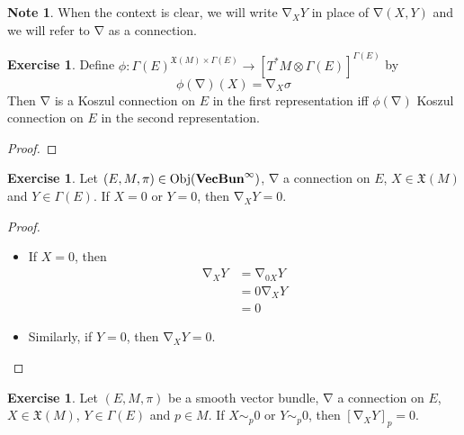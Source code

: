 \documentclass{book}
\theoremstyle{definition}
\newtheorem{note}[definition]{Note}
\newtheorem{ex}[definition]{Exercise}
\newcommand{\sig}{\sigma}
\newcommand{\Gam}{\Gamma}
\newcommand{\MFX}{\mathfrak{X}}
\DeclareMathOperator{\Obj}{Obj}
\DeclareMathOperator{\nab}{\nabla}
\DeclareMathOperator*{\VecBuninf}{\text{\tbf{VecBun}}^{\infty}}
\DeclareMathOperator*{\0}{\mbf{0}}
\DeclareMathOperator*{\1}{\mbf{1}}
\newcommand{\tbf}[1]{\textbf{#1}}
\begin{document}
	\begin{note}
		When the context is clear, we will write $\nab_X Y$ in place of $\nab(X,Y)$ and we will refer to $\nab$ as a connection.
	\end{note}

	\begin{ex}
		Define $\phi:  \Gam(E)^{\MFX(M) \times \Gam(E)} \rightarrow [T^*M \otimes \Gam(E)]^{\Gam(E)}$ by 
		$$\phi(\nab)(X) = \nab_X \sig$$
		Then $\nab$ is a Koszul connection on $E$ in the first representation iff $\phi(\nab)$ Koszul connection on $E$ in the second representation.
	\end{ex}

	\begin{proof}
		
	\end{proof}

	\begin{ex}
		Let $(E, M, \pi) \in \Obj(\VecBuninf)$, $\nab$ a connection on $E$, $X \in \MFX(M)$ and $Y \in \Gam(E)$. If $X = 0$ or $Y = 0$, then $\nab_X Y = 0$.
	\end{ex}

	\begin{proof}\
		\begin{itemize}
			\item If $X = 0$, then 
			\begin{align*}
				\nab_X Y
				& = \nab_{0 X} Y \\
				& = 0 \nab_X Y \\
				& = 0
			\end{align*}
			\item Similarly, if $Y = 0$, then $\nab_X Y = 0$.
		\end{itemize}
	\end{proof}

	\begin{ex}
		Let $(E, M, \pi)$ be a smooth vector bundle, $\nab$ a connection on $E$, $X \in \MFX(M)$, $Y \in \Gam(E)$ and $p \in M$. If $X \sim_p 0$ or $Y \sim_p 0$, then $[\nab_{X}Y]_p = 0$.
	\end{ex}
\end{document}
